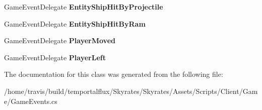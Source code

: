 \begin{DoxyCompactItemize}
\item 
\hypertarget{class_skyrates_1_1_client_1_1_game_1_1_event_1_1_game_events_a89d17208f4b6f259f8fc03ead86b6a13}{Game\-Event\-Delegate {\bfseries Entity\-Ship\-Hit\-By\-Projectile}}\label{class_skyrates_1_1_client_1_1_game_1_1_event_1_1_game_events_a89d17208f4b6f259f8fc03ead86b6a13}

\item 
\hypertarget{class_skyrates_1_1_client_1_1_game_1_1_event_1_1_game_events_a418c2702fb43809be5279b4c0d877972}{Game\-Event\-Delegate {\bfseries Entity\-Ship\-Hit\-By\-Ram}}\label{class_skyrates_1_1_client_1_1_game_1_1_event_1_1_game_events_a418c2702fb43809be5279b4c0d877972}

\item 
\hypertarget{class_skyrates_1_1_client_1_1_game_1_1_event_1_1_game_events_a347e7a35ad1bbb862f1a4028c2e375ef}{Game\-Event\-Delegate {\bfseries Player\-Moved}}\label{class_skyrates_1_1_client_1_1_game_1_1_event_1_1_game_events_a347e7a35ad1bbb862f1a4028c2e375ef}

\item 
\hypertarget{class_skyrates_1_1_client_1_1_game_1_1_event_1_1_game_events_a5dc1bfc1852ff08c98f6c521b96b1b07}{Game\-Event\-Delegate {\bfseries Player\-Left}}\label{class_skyrates_1_1_client_1_1_game_1_1_event_1_1_game_events_a5dc1bfc1852ff08c98f6c521b96b1b07}

\end{DoxyCompactItemize}


The documentation for this class was generated from the following file\-:\begin{DoxyCompactItemize}
\item 
/home/travis/build/temportalflux/\-Skyrates/\-Skyrates/\-Assets/\-Scripts/\-Client/\-Game/Game\-Events.\-cs\end{DoxyCompactItemize}
